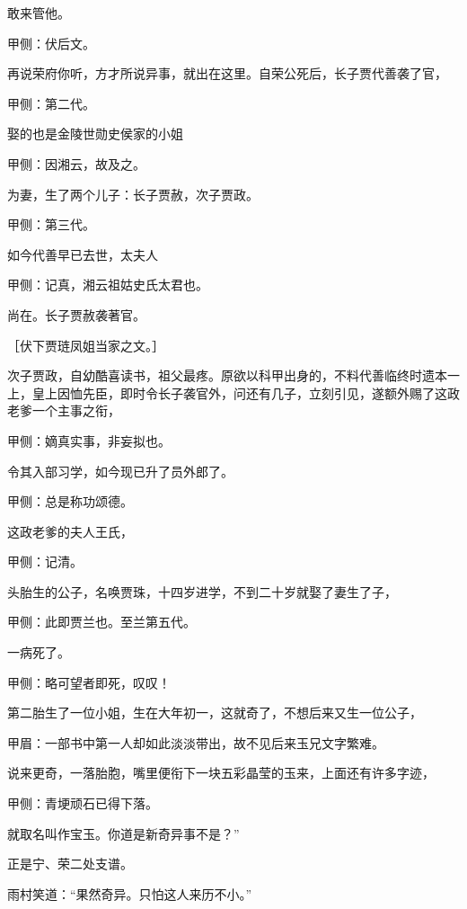 \begin{parag}
敢来管他。\begin{note}甲侧：伏后文。\end{note}再说荣府你听，方才所说异事，就出在这里。自荣公死后，长子贾代善袭了官，\begin{note}甲侧：第二代。\end{note}娶的也是金陵世勋史侯家的小姐\begin{note}甲侧：因湘云，故及之。\end{note}为妻，生了两个儿子：长子贾赦，次子贾政。\begin{note}甲侧：第三代。\end{note}如今代善早已去世，太夫人\begin{note}甲侧：记真，湘云祖姑史氏太君也。\end{note}尚在。长子贾赦袭著官。\begin{note}［伏下贾琏凤姐当家之文。］\end{note}次子贾政，自幼酷喜读书，祖父最疼。原欲以科甲出身的，不料代善临终时遗本一上，皇上因恤先臣，即时令长子袭官外，问还有几子，立刻引见，遂额外赐了这政老爹一个主事之衔，\begin{note}甲侧：嫡真实事，非妄拟也。\end{note}令其入部习学，如今现已升了员外郎了。\begin{note}甲侧：总是称功颂德。\end{note}这政老爹的夫人王氏，\begin{note}甲侧：记清。\end{note}头胎生的公子，名唤贾珠，十四岁进学，不到二十岁就娶了妻生了子，\begin{note}甲侧：此即贾兰也。至兰第五代。\end{note}一病死了。\begin{note}甲侧：略可望者即死，叹叹！\end{note}第二胎生了一位小姐，生在大年初一，这就奇了，不想后来又生一位公子，\begin{note}甲眉：一部书中第一人却如此淡淡带出，故不见后来玉兄文字繁难。\end{note}说来更奇，一落胎胞，嘴里便衔下一块五彩晶莹的玉来，上面还有许多字迹，\begin{note}甲侧：青埂顽石已得下落。\end{note}就取名叫作宝玉。你道是新奇异事不是？”\begin{note}正是宁、荣二处支谱。\end{note}
\end{parag}


\begin{parag}
    雨村笑道：“果然奇异。只怕这人来历不小。”
\end{parag}


